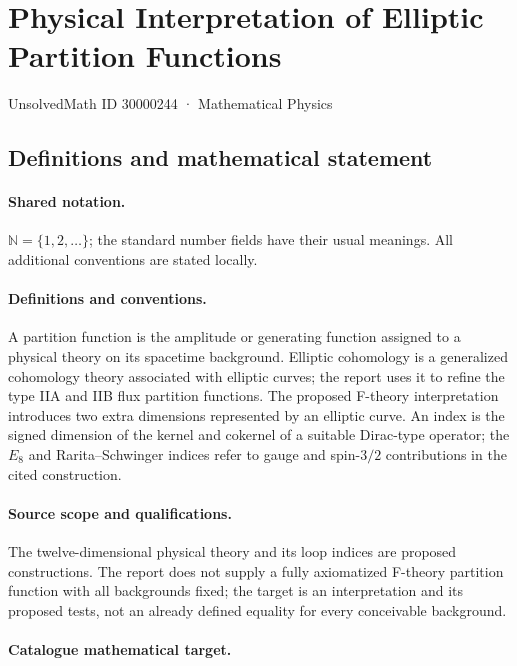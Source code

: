 \documentclass[11pt]{article}
\begin{document}
\setcounter{section}{30000243}
\section{Physical Interpretation of Elliptic Partition Functions}\label{30000244}
{\small UnsolvedMath ID 30000244 · Mathematical Physics}
\subsection{Definitions and mathematical statement}

\paragraph{Shared notation.}$\mathbb N=\{1,2,\ldots\}$; the standard number fields have their usual meanings. All additional conventions are stated locally.


\paragraph{Definitions and conventions.} A partition function is the amplitude or generating function assigned to a physical theory on its spacetime background. Elliptic cohomology is a generalized cohomology theory associated with elliptic curves; the report uses it to refine the type IIA and IIB flux partition functions. The proposed F-theory interpretation introduces two extra dimensions represented by an elliptic curve. An index is the signed dimension of the kernel and cokernel of a suitable Dirac-type operator; the $E_8$ and Rarita--Schwinger indices refer to gauge and spin-$3/2$ contributions in the cited construction.

\paragraph{Source scope and qualifications.} The twelve-dimensional physical theory and its loop indices are proposed constructions. The report does not supply a fully axiomatized F-theory partition function with all backgrounds fixed; the target is an interpretation and its proposed tests, not an already defined equality for every conceivable background.

\paragraph{Catalogue mathematical target.}
\end{document}
